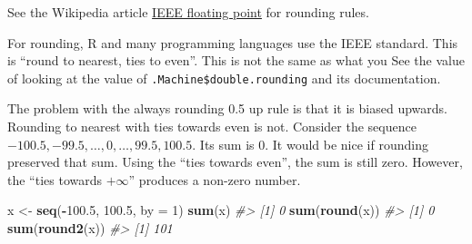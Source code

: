 \documentclass[]{book}
\newenvironment{Shaded}{\begin{snugshade}}{\end{snugshade}}
\newcommand{\CommentTok}[1]{\textcolor[rgb]{0.56,0.35,0.01}{\textit{#1}}}
\newcommand{\ControlFlowTok}[1]{\textcolor[rgb]{0.13,0.29,0.53}{\textbf{#1}}}
\newcommand{\DataTypeTok}[1]{\textcolor[rgb]{0.13,0.29,0.53}{#1}}
\newcommand{\DecValTok}[1]{\textcolor[rgb]{0.00,0.00,0.81}{#1}}
\newcommand{\FloatTok}[1]{\textcolor[rgb]{0.00,0.00,0.81}{#1}}
\newcommand{\KeywordTok}[1]{\textcolor[rgb]{0.13,0.29,0.53}{\textbf{#1}}}
\newcommand{\NormalTok}[1]{#1}
\newcommand{\OperatorTok}[1]{\textcolor[rgb]{0.81,0.36,0.00}{\textbf{#1}}}
\newcommand{\OtherTok}[1]{\textcolor[rgb]{0.56,0.35,0.01}{#1}}
\newcommand{\StringTok}[1]{\textcolor[rgb]{0.31,0.60,0.02}{#1}}
\theoremstyle{plain}
\theoremstyle{remark}
\theoremstyle{definition}
\theoremstyle{definition}
\theoremstyle{definition}
\theoremstyle{remark}
\begin{document}
See the Wikipedia article
\href{https://en.wikipedia.org/wiki/IEEE_floating_point}{IEEE floating
point} for rounding rules.

For rounding, R and many programming languages use the IEEE standard.
This is ``round to nearest, ties to even''. This is not the same as what
you See the value of looking at the value of
\texttt{.Machine\$double.rounding} and its documentation.

\begin{Shaded}
\end{Shaded}

The problem with the always rounding 0.5 up rule is that it is biased
upwards. Rounding to nearest with ties towards even is not. Consider the
sequence \(-100.5, -99.5, \dots, 0, \dots, 99.5, 100.5\). Its sum is 0.
It would be nice if rounding preserved that sum. Using the ``ties
towards even'', the sum is still zero. However, the ``ties towards
\(+\infty\)'' produces a non-zero number.

\begin{Shaded}
\begin{Highlighting}[]
\NormalTok{x <-}\StringTok{ }\KeywordTok{seq}\NormalTok{(}\OperatorTok{-}\FloatTok{100.5}\NormalTok{, }\FloatTok{100.5}\NormalTok{, }\DataTypeTok{by =} \DecValTok{1}\NormalTok{)}
\KeywordTok{sum}\NormalTok{(x)}
\CommentTok{#> [1] 0}
\KeywordTok{sum}\NormalTok{(}\KeywordTok{round}\NormalTok{(x))}
\CommentTok{#> [1] 0}
\KeywordTok{sum}\NormalTok{(}\KeywordTok{round2}\NormalTok{(x))}
\CommentTok{#> [1] 101}
\end{Highlighting}
\end{Shaded}
\end{document}
